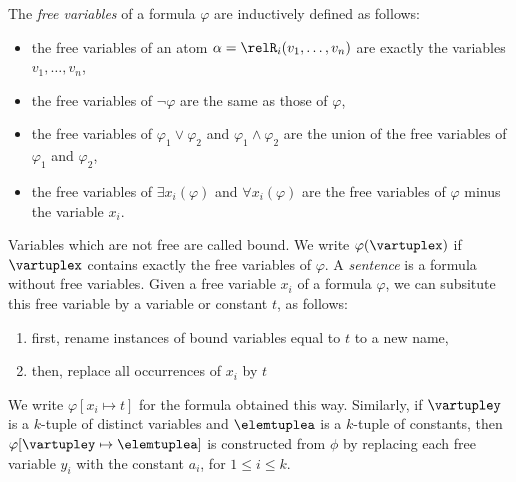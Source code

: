 \begin{samepage}
The \emph{free variables} of a formula $\varphi$ are inductively defined as follows:
\begin{itemize}
  \item the free variables of an atom $\alpha = \relR_{i}(v_{1}, \ldots, v_{n})$ are exactly the variables $v_{1}, \ldots, v_{n}$,
  \item the free variables of $\neg \varphi$ are the same as those of $\varphi$,
  \item the free variables of $\varphi_{1} \lor \varphi_{2}$ and $\varphi_{1} \land \varphi_{2}$ are the union of the free variables of $\varphi_{1}$ and $\varphi_{2}$,
  \item the free variables of $\exists{x_{i}(\varphi)}$ and $\forall{x_{i}(\varphi)}$ are the free variables of $\varphi$ minus the variable $x_{i}$.
\end{itemize}
\end{samepage}
Variables which are not free are called bound.
We write $\varphi(\vartuplex)$ if $\vartuplex$ contains exactly the free variables of $\varphi$.
A \emph{sentence} is a formula without free variables.
Given a free variable $x_{i}$ of a formula $\varphi$, we can subsitute this free variable by a variable or constant $t$, as follows:
\begin{enumerate}
  \item first, rename instances of bound variables equal to $t$ to a new name,
  \item then, replace all occurrences of $x_{i}$ by $t$
\end{enumerate}
We write $\varphi[x_{i} \mapsto t]$ for the formula obtained this way.
Similarly, if $\vartupley$ is a $k$-tuple of distinct variables and $\elemtuplea$ is a $k$-tuple of constants, then $\varphi[\vartupley \mapsto \elemtuplea]$ is constructed from $\phi$ by replacing each free variable $y_{i}$ with the constant $a_{i}$, for $1 \le i \le k$.


